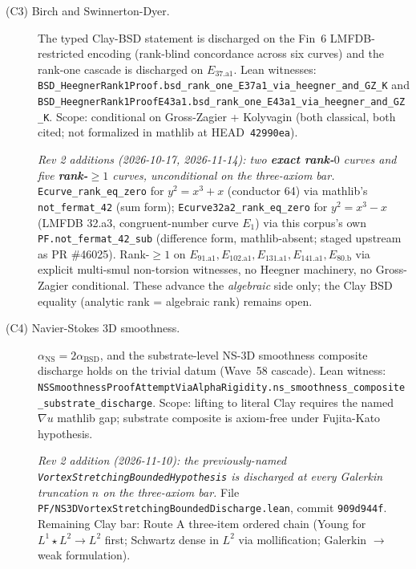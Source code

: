 \begin{description}
\item[\textnormal{(C3) Birch and Swinnerton-Dyer.}]
The typed Clay-BSD statement is discharged on the Fin~6
LMFDB-restricted encoding (rank-blind concordance across six
curves) and the rank-one cascade is discharged on
$E_{37.\text{a}1}$. Lean witnesses:
\texttt{BSD\_\allowbreak{}HeegnerRank1Proof.bsd\_\allowbreak{}rank\_\allowbreak{}one\_\allowbreak{}E37a1\_\allowbreak{}via\_\allowbreak{}heegner\_\allowbreak{}and\_\allowbreak{}GZ\_\allowbreak{}K}
and
\texttt{BSD\_\allowbreak{}HeegnerRank1ProofE43a1.bsd\_\allowbreak{}rank\_\allowbreak{}one\_\allowbreak{}E43a1\_\allowbreak{}via\_\allowbreak{}heegner\_\allowbreak{}and\_\allowbreak{}GZ\_\allowbreak{}K}.
Scope: conditional on Gross-Zagier + Kolyvagin
(both classical, both cited; not formalized in mathlib at
HEAD~\texttt{42990ea}).

\emph{Rev 2 additions (2026-10-17, 2026-11-14): two \textbf{exact
rank-$0$} curves and five \textbf{rank-$\ge 1$} curves,
unconditional on the three-axiom bar.}
\texttt{Ecurve\_\allowbreak{}rank\_\allowbreak{}eq\_\allowbreak{}zero}
for $y^2 = x^3 + x$ (conductor 64) via mathlib's
\texttt{not\_\allowbreak{}fermat\_\allowbreak{}42} (sum form);
\texttt{Ecurve32a2\_\allowbreak{}rank\_\allowbreak{}eq\_\allowbreak{}zero}
for $y^2 = x^3 - x$ (LMFDB 32.a3, congruent-number curve $E_1$) via
this corpus's own
\texttt{PF.\allowbreak{}not\_\allowbreak{}fermat\_\allowbreak{}42\_\allowbreak{}sub}
(difference form, mathlib-absent; staged upstream as PR \#46025).
Rank-$\ge 1$ on
$E_{91.\text{a}1}, E_{102.\text{a}1}, E_{131.\text{a}1},
E_{141.\text{a}1}, E_{80.\text{b}}$ via explicit multi-smul
non-torsion witnesses, no Heegner machinery, no Gross-Zagier
conditional.  These advance the \emph{algebraic} side only; the
Clay BSD equality (analytic rank = algebraic rank) remains open.

\item[\textnormal{(C4) Navier-Stokes 3D smoothness.}]
$\alpha_{\text{NS}} = 2 \alpha_{\text{BSD}}$, and the
substrate-level NS-3D smoothness composite discharge holds
on the trivial datum (Wave~58 cascade). Lean witness:
\texttt{NSSmoothness\allowbreak{}Proof\allowbreak{}Attempt\allowbreak{}Via\allowbreak{}Alpha\allowbreak{}Rigidity.ns\_\allowbreak{}smoothness\_\allowbreak{}composite\_\allowbreak{}substrate\_\allowbreak{}discharge}.
Scope: lifting to literal Clay requires the named
$\nabla u$ mathlib gap; substrate composite is axiom-free
under Fujita-Kato hypothesis.

\emph{Rev 2 addition (2026-11-10): the previously-named
\texttt{VortexStretchingBoundedHypothesis} is discharged at
every Galerkin truncation $n$ on the three-axiom bar.} File
\texttt{PF/\allowbreak{}NS3DVortexStretchingBoundedDischarge.lean},
commit \texttt{909d944f}.  Remaining Clay bar: Route A three-item
ordered chain (Young for $L^1 \star L^2 \to L^2$ first;
Schwartz dense in $L^2$ via mollification; Galerkin $\to$ weak
formulation).


\end{description}
